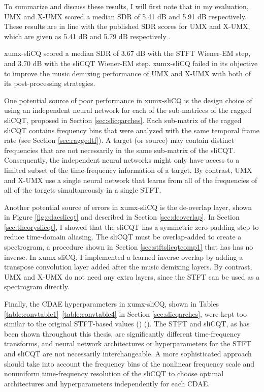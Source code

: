 \documentclass[report.tex]{subfiles}
\begin{document}
\begin{shaded}

To summarize and discuss these results, I will first note that in my evaluation, UMX and X-UMX scored a median SDR of 5.41 dB and 5.91 dB respectively. These results are in line with the published SDR scores for UMX and X-UMX, which are given as 5.41 dB and 5.79 dB respectively \parencite[4]{xumx}.

xumx-sliCQ scored a median SDR of 3.67 dB with the STFT Wiener-EM step, and 3.70 dB with the sliCQT Wiener-EM step. xumx-sliCQ failed in its objective to improve the music demixing performance of UMX and X-UMX with both of its post-processing strategies.

One potential source of poor performance in xumx-sliCQ is the design choice of using an independent neural network for each of the sub-matrices of the ragged sliCQT, proposed in Section \ref{sec:slicqarches}. Each sub-matrix of the ragged sliCQT contains frequency bins that were analyzed with the same temporal frame rate (see Section \ref{sec:raggedtf}). A target (or source) may contain distinct frequencies that are not necessarily in the same sub-matrix of the sliCQT. Consequently, the independent neural networks might only have access to a limited subset of the time-frequency information of a target. By contrast, UMX and X-UMX use a single neural network that learns from all of the frequencies of all of the targets simultaneously in a single STFT.

Another potential source of errors in xumx-sliCQ is the de-overlap layer, shown in Figure \ref{fig:cdaeslicqt} and described in Section \ref{sec:deoverlap}. In Section \ref{sec:theoryslicqt}, I showed that the sliCQT has a symmetric zero-padding step to reduce time-domain aliasing. The sliCQT must be overlap-added to create a spectrogram, a procedure shown in Section \ref{sec:stftslicqtcomp1} that has has no inverse. In xumx-sliCQ, I implemented a learned inverse overlap by adding a transpose convolution layer added after the music demixing layers. By contrast, UMX and X-UMX do not need any extra layers, since the STFT can be used as a spectrogram directly.

Finally, the CDAE hyperparameters in xumx-sliCQ, shown in Tables \ref{table:convtable1}--\ref{table:convtable4} in Section \ref{sec:slicqarches}, were kept too similar to the original STFT-based values (\cite[3]{plumbley1}) (\cite[3]{plumbley2}). The STFT and sliCQT, as has been shown throughout this thesis, are significantly different time-frequency transforms, and neural network architectures or hyperparameters for the STFT and sliCQT are not necessarily interchangeable. A more sophisticated approach should take into account the frequency bins of the nonlinear frequency scale and nonuniform time-frequency resolution of the sliCQT to choose optimal architectures and hyperparameters independently for each CDAE.

\end{shaded}
\end{document}
